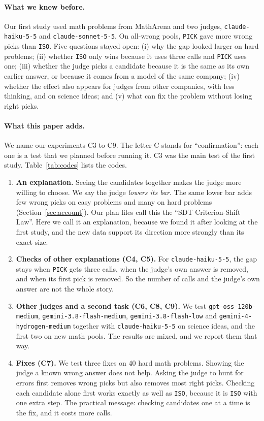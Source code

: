 \documentclass[10pt,twocolumn]{article}
\begin{document}
\paragraph{What we knew before.}
Our first study \citep[v1;][]{sharma2026nocandidate} used math problems from MathArena \citep{balunovic2025matharena} and two judges, \texttt{claude-haiku-5-5} and \texttt{claude-sonnet-5-5}. On all-wrong pools, \texttt{PICK} gave more wrong picks than \texttt{ISO}. Five questions stayed open: (i) why the gap looked larger on hard problems; (ii) whether \texttt{ISO} only wins because it uses three calls and \texttt{PICK} uses one; (iii) whether the judge picks a candidate because it is the same as its own earlier answer, or because it comes from a model of the same company; (iv) whether the effect also appears for judges from other companies, with less thinking, and on science ideas; and (v) what can fix the problem without losing right picks.

\paragraph{What this paper adds.}
We name our experiments C3 to C9. The letter C stands for ``confirmation'': each one is a test that we planned before running it. C3 was the main test of the first study. Table~\ref{tab:codes} lists the codes.
\begin{enumerate}\setlength{\itemsep}{2pt}
\item \textbf{An explanation.} Seeing the candidates together makes the judge more willing to choose. We say the judge \emph{lowers its bar}. The same lower bar adds few wrong picks on easy problems and many on hard problems (Section~\ref{sec:account}). Our plan files call this the ``SDT Criterion-Shift Law''. Here we call it an explanation, because we found it after looking at the first study, and the new data support its direction more strongly than its exact size.
\item \textbf{Checks of other explanations (C4, C5).} For \texttt{claude-haiku-5-5}, the gap stays when \texttt{PICK} gets three calls, when the judge's own answer is removed, and when its first pick is removed. So the number of calls and the judge's own answer are not the whole story.
\item \textbf{Other judges and a second task (C6, C8, C9).} We test \texttt{gpt-oss-120b-medium}, \texttt{gemini-3.8-flash-medium}, \texttt{gemini-3.8-flash-low} and \texttt{gemini-4-hydrogen-medium} together with \texttt{claude-haiku-5-5} on science ideas, and the first two on new math pools. The results are mixed, and we report them that way.
\item \textbf{Fixes (C7).} We test three fixes on 40 hard math problems. Showing the judge a known wrong answer does not help. Asking the judge to hunt for errors first removes wrong picks but also removes most right picks. Checking each candidate alone first works exactly as well as \texttt{ISO}, because it is \texttt{ISO} with one extra step. The practical message: checking candidates one at a time is the fix, and it costs more calls.
\end{enumerate}
\end{document}
